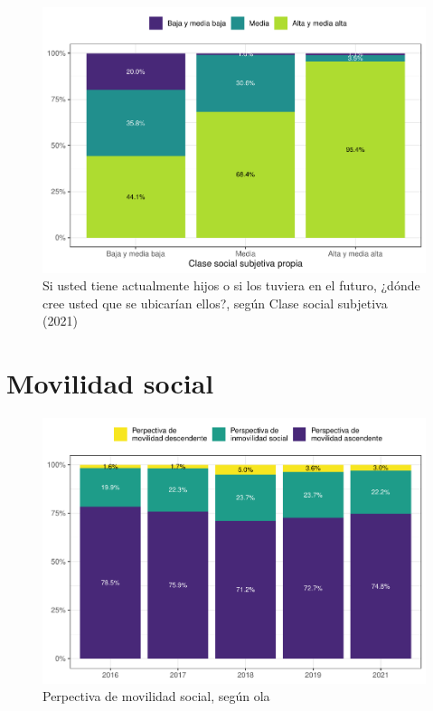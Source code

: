 \documentclass[
  12pt,
  openany]{book}
\begin{document}
\begin{figure}

{\centering \includegraphics{reporte-elsoc_files/figure-latex/esshijos-ess-1} 

}

\caption{Si usted tiene actualmente hijos o si los tuviera en el futuro, ¿dónde cree usted que se ubicarían ellos?, según Clase social subjetiva (2021)}\label{fig:esshijos-ess}
\end{figure}

\hypertarget{movilidad-social}{%
\section{Movilidad social}\label{movilidad-social}}

\begin{figure}

{\centering \includegraphics{reporte-elsoc_files/figure-latex/mov-soc-rec-1} 

}

\caption{Perpectiva de movilidad social, según ola}\label{fig:mov-soc-rec}
\end{figure}
\end{document}
